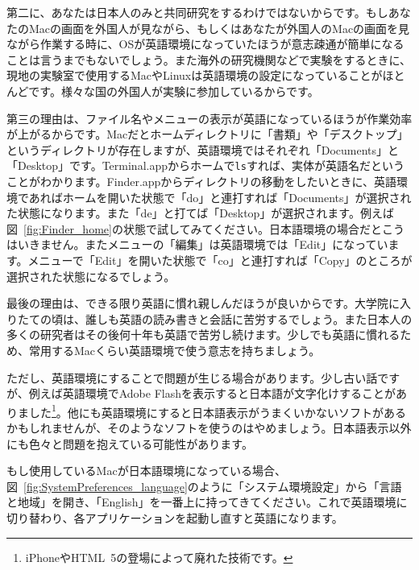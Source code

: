 第二に、あなたは日本人のみと共同研究をするわけではないからです。もしあなたのMacの画面を外国人が見ながら、もしくはあなたが外国人のMacの画面を見ながら作業する時に、OSが英語環境になっていたほうが意志疎通が簡単になることは言うまでもないでしょう。また海外の研究機関などで実験をするときに、現地の実験室で使用するMacやLinuxは英語環境の設定になっていることがほとんどです。様々な国の外国人が実験に参加しているからです。

第三の理由は、ファイル名やメニューの表示が英語になっているほうが作業効率が上がるからです。Macだとホームディレクトリに「書類」や「デスクトップ」というディレクトリが存在しますが、英語環境ではそれぞれ「Documents」と「Desktop」です。Terminal.appからホームで\texttt{ls}すれば、実体が英語名だということがわかります。Finder.appからディレクトリの移動をしたいときに、英語環境であればホームを開いた状態で「do」と連打すれば「Documents」が選択された状態になります。また「de」と打てば「Desktop」が選択されます。例えば図~\ref{fig:Finder_home}の状態で試してみてください。日本語環境の場合だとこうはいきません。またメニューの「編集」は英語環境では「Edit」になっています。メニューで「Edit」を開いた状態で「co」と連打すれば「Copy」のところが選択された状態になるでしょう。

最後の理由は、できる限り英語に慣れ親しんだほうが良いからです。大学院に入りたての頃は、誰しも英語の読み書きと会話に苦労するでしょう。また日本人の多くの研究者はその後何十年も英語で苦労し続けます。少しでも英語に慣れるため、常用するMacくらい英語環境で使う意志を持ちましょう。

ただし、英語環境にすることで問題が生じる場合があります。少し古い話ですが、例えば英語環境でAdobe Flashを表示すると日本語が文字化けすることがありました\footnote{iPhoneやHTML~5の登場によって廃れた技術です。}。他にも英語環境にすると日本語表示がうまくいかないソフトがあるかもしれませんが、そのようなソフトを使うのはやめましょう。日本語表示以外にも色々と問題を抱えている可能性があります。

もし使用しているMacが日本語環境になっている場合、図~\ref{fig:SystemPreferences_language}のように「システム環境設定」から「言語と地域」を開き、「English」を一番上に持ってきてください。これで英語環境に切り替わり、各アプリケーションを起動し直すと英語になります。

